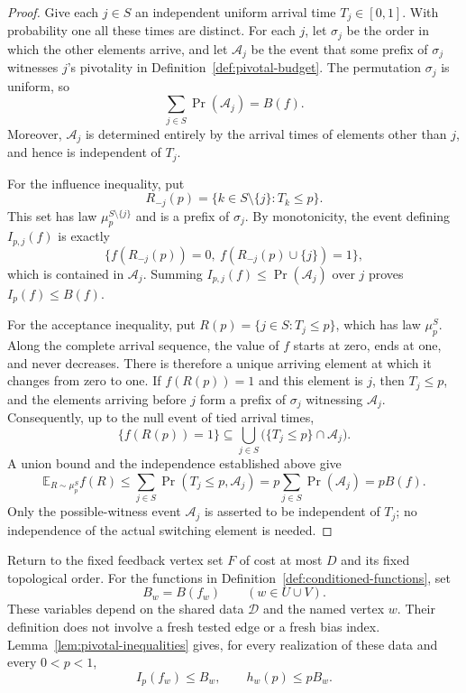 \begin{proof}
Give each $j\in S$ an independent uniform arrival time $T_j\in[0,1]$.
With probability one all these times are distinct.  For each $j$, let
$\sigma_j$ be the order in which the other elements arrive, and let
$\mathcal A_j$ be the event that some prefix of $\sigma_j$ witnesses
$j$'s pivotality in Definition~\ref{def:pivotal-budget}.  The permutation
$\sigma_j$ is uniform, so
\[
 \sum_{j\in S}\Pr(\mathcal A_j)=B(f).
\]
Moreover, $\mathcal A_j$ is determined entirely by the arrival times of
elements other than $j$, and hence is independent of $T_j$.

For the influence inequality, put
\[
 R_{-j}(p)=\{k\in S\setminus\{j\}:T_k\le p\}.
\]
This set has law $\mu_p^{S\setminus\{j\}}$ and is a prefix of
$\sigma_j$.  By monotonicity, the event defining $I_{p,j}(f)$ is exactly
\[
 \{f(R_{-j}(p))=0,\ f(R_{-j}(p)\cup\{j\})=1\},
\]
which is contained in $\mathcal A_j$.  Summing
$I_{p,j}(f)\le\Pr(\mathcal A_j)$ over $j$ proves $I_p(f)\le B(f)$.

For the acceptance inequality, put $R(p)=\{j\in S:T_j\le p\}$, which
has law $\mu_p^S$.  Along the complete arrival sequence, the value of
$f$ starts at zero, ends at one, and never decreases.  There is therefore
a unique arriving element at which it changes from zero to one.  If
$f(R(p))=1$ and this element is $j$, then $T_j\le p$, and the elements
arriving before $j$ form a prefix of $\sigma_j$ witnessing
$\mathcal A_j$.  Consequently, up to the null event of tied arrival times,
\[
 \{f(R(p))=1\}
 \subseteq\bigcup_{j\in S}\bigl(\{T_j\le p\}\cap\mathcal A_j\bigr).
\]
A union bound and the independence established above give
\[
 \mathbb E_{R\sim\mu_p^S} f(R)
 \le\sum_{j\in S}\Pr(T_j\le p,\mathcal A_j)
 =p\sum_{j\in S}\Pr(\mathcal A_j)
 =pB(f).
\]
Only the possible-witness event $\mathcal A_j$ is asserted to be
independent of $T_j$; no independence of the actual switching element is
needed.
\end{proof}

Return to the fixed feedback vertex set $F$ of cost at most $D$ and its
fixed topological order.  For the functions in
Definition~\ref{def:conditioned-functions}, set
\[
 B_w=B(f_w)\qquad(w\in U\cup V).
\]
These variables depend on the shared data $\mathcal D$ and the named
vertex $w$.  Their definition does not involve a fresh tested edge or a
fresh bias index.  Lemma~\ref{lem:pivotal-inequalities} gives, for every
realization of these data and every $0<p<1$,
\[
 I_p(f_w)\le B_w,
 \qquad h_w(p)\le pB_w.
\]

